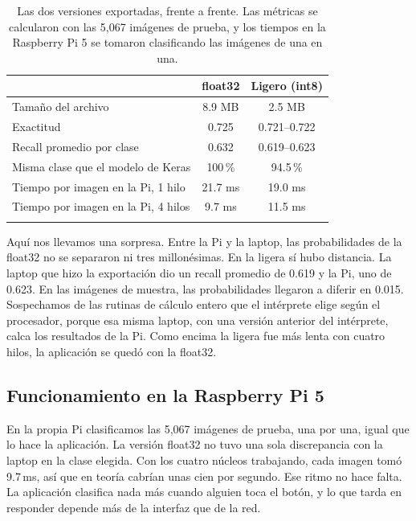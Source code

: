 \documentclass[pdflatex,sn-mathphys-num]{sn-jnl}%
\theoremstyle{thmstyleone}%
\theoremstyle{thmstyletwo}%
\theoremstyle{thmstylethree}%
\begin{document}
\begin{table}[h]
\caption{Las dos versiones exportadas, frente a frente. Las métricas se calcularon con las 5,067 imágenes de prueba, y los tiempos en la Raspberry Pi 5 se tomaron clasificando las imágenes de una en una.}\label{tab2}%
\begin{tabular*}{\textwidth}{@{\extracolsep\fill}lcc}
\toprule
 & float32 & Ligero (int8) \\
\midrule
Tamaño del archivo & 8.9 MB & 2.5 MB \\
Exactitud & 0.725 & 0.721--0.722\footnotemark[1] \\
Recall promedio por clase & 0.632 & 0.619--0.623\footnotemark[1] \\
Misma clase que el modelo de Keras & 100\,\% & 94.5\,\% \\
Tiempo por imagen en la Pi, 1 hilo & 21.7 ms & 19.0 ms \\
Tiempo por imagen en la Pi, 4 hilos & 9.7 ms & 11.5 ms \\
\botrule
\end{tabular*}
\end{table}

Aquí nos llevamos una sorpresa. Entre la Pi y la laptop, las probabilidades de la float32 no se separaron ni tres millonésimas. En la ligera sí hubo distancia. La laptop que hizo la exportación dio un recall promedio de 0.619 y la Pi, uno de 0.623. En las imágenes de muestra, las probabilidades llegaron a diferir en 0.015. Sospechamos de las rutinas de cálculo entero que el intérprete elige según el procesador, porque esa misma laptop, con una versión anterior del intérprete, calca los resultados de la Pi. Como encima la ligera fue más lenta con cuatro hilos, la aplicación se quedó con la float32.

\subsection{Funcionamiento en la Raspberry Pi 5}\label{subsec5}

En la propia Pi clasificamos las 5,067 imágenes de prueba, una por una, igual que lo hace la aplicación. La versión float32 no tuvo una sola discrepancia con la laptop en la clase elegida. Con los cuatro núcleos trabajando, cada imagen tomó 9.7\,ms, así que en teoría cabrían unas cien por segundo. Ese ritmo no hace falta. La aplicación clasifica nada más cuando alguien toca el botón, y lo que tarda en responder depende más de la interfaz que de la red.
\end{document}
